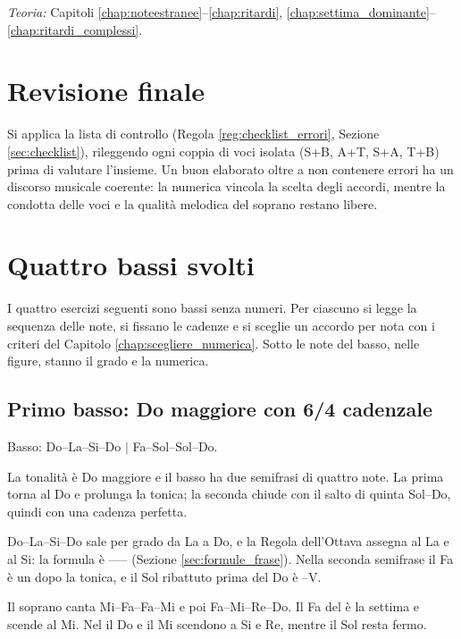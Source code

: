 \textit{Teoria:} Capitoli \ref{chap:noteestranee}--\ref{chap:ritardi}, \ref{chap:settima_dominante}--\ref{chap:ritardi_complessi}.

\section{Revisione finale}
\label{sec:fase6_numerato}

Si applica la lista di controllo (Regola \ref{reg:checklist_errori}, Sezione \ref{sec:checklist}), rileggendo ogni coppia di voci isolata (S+B, A+T, S+A, T+B) prima di valutare l'insieme. Un buon elaborato oltre a non contenere errori ha un discorso musicale coerente: la numerica vincola la scelta degli accordi, mentre la condotta delle voci e la qualità melodica del soprano restano libere.

\section{Quattro bassi svolti}
\label{sec:bassi_svolti}

I quattro esercizi seguenti sono bassi senza numeri. Per ciascuno si legge la sequenza delle note, si fissano le cadenze e si sceglie un accordo per nota con i criteri del Capitolo \ref{chap:scegliere_numerica}. Sotto le note del basso, nelle figure, stanno il grado e la numerica.

\subsection*{Primo basso: Do maggiore con 6/4 cadenzale}

Basso: Do--La--Si--Do $\mid$ Fa--Sol--Sol--Do.

La tonalità è Do maggiore e il basso ha due semifrasi di quattro note. La prima torna al Do e prolunga la tonica; la seconda chiude con il salto di quinta Sol--Do, quindi con una cadenza perfetta.

Do--La--Si--Do sale per grado da La a Do, e la Regola dell'Ottava assegna  al La e  al Si: la formula è ------ (Sezione \ref{sec:formule_frase}). Nella seconda semifrase il Fa è un  dopo la tonica, e il Sol ribattuto prima del Do è --V.

Il soprano canta Mi--Fa--Fa--Mi e poi Fa--Mi--Re--Do. Il Fa del  è la settima e scende al Mi. Nel  il Do e il Mi scendono a Si e Re, mentre il Sol resta fermo.

